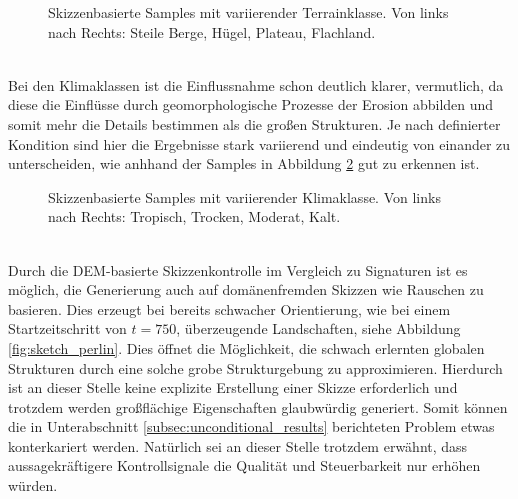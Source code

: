 \begin{figure}[htbp]
    \centering
    \caption{Skizzenbasierte Samples mit variierender Terrainklasse. Von links nach Rechts: Steile Berge, Hügel, Plateau, Flachland.}
    \label{fig:sketch_terrains}
\end{figure} \\
Bei den Klimaklassen ist die Einflussnahme schon deutlich klarer, vermutlich, da diese die Einflüsse durch geomorphologische Prozesse der Erosion abbilden und somit mehr die Details bestimmen als die großen Strukturen. Je nach definierter Kondition sind hier die Ergebnisse stark variierend und eindeutig von einander zu unterscheiden, wie anhhand der Samples in Abbildung \ref{fig:sketch_climates} gut zu erkennen ist. 
\begin{figure}[htbp]
    \centering
    \caption{Skizzenbasierte Samples mit variierender Klimaklasse. Von links nach Rechts: Tropisch, Trocken, Moderat, Kalt.}
    \label{fig:sketch_climates}
\end{figure} \\
Durch die \ac{DEM}-basierte Skizzenkontrolle im Vergleich zu Signaturen ist es möglich, die Generierung auch auf domänenfremden Skizzen wie Rauschen zu basieren. Dies erzeugt bei bereits schwacher Orientierung, wie bei einem Startzeitschritt von $t=750$, überzeugende Landschaften, siehe Abbildung \ref{fig:sketch_perlin}. Dies öffnet die Möglichkeit, die schwach erlernten globalen Strukturen durch eine solche grobe Strukturgebung zu approximieren. Hierdurch ist an dieser Stelle keine explizite Erstellung einer Skizze erforderlich und trotzdem werden großflächige Eigenschaften glaubwürdig generiert. Somit können die in Unterabschnitt \ref{subsec:unconditional_results} berichteten Problem etwas konterkariert werden. Natürlich sei an dieser Stelle trotzdem erwähnt, dass aussagekräftigere Kontrollsignale die Qualität und Steuerbarkeit nur erhöhen würden.
